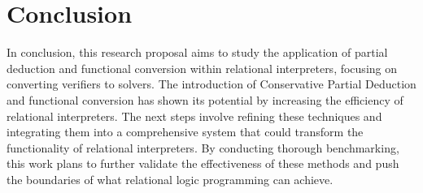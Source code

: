 
\section{Conclusion}

In conclusion, this research proposal aims to study the application of partial deduction and functional conversion within relational interpreters, focusing on converting verifiers to solvers. 
The introduction of Conservative Partial Deduction and functional conversion has shown its potential by increasing the efficiency of relational interpreters. 
The next steps involve refining these techniques and integrating them into a comprehensive system that could transform the functionality of relational interpreters. 
By conducting thorough benchmarking, this work plans to further validate the effectiveness of these methods and push the boundaries of what relational logic programming can achieve.